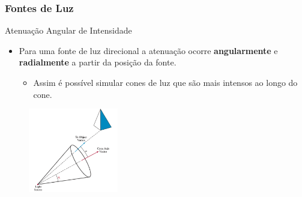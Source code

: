 \documentclass{beamer}
\begin{document}
\begin{frame}
\frametitle{Fontes de Luz}

	\begin{block}{Atenuação Angular de Intensidade}
		\begin{itemize}
			\item Para uma fonte de luz direcional a atenuação ocorre \textbf{angularmente} e \textbf{radialmente} a partir da posição da fonte.
			\begin{itemize}
				\item Assim é possível simular cones de luz que são mais intensos ao longo do cone.
			\end{itemize}								 
		\end{itemize}
	\end{block}

	\begin{figure}[!h]
			\begin{center}
			\includegraphics[width=0.35\textwidth]{Figures/OloVec}
			\end{center}
	\end{figure}	
	
\end{frame}
\end{document}
